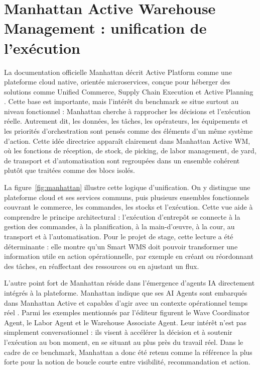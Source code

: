 
\section{Manhattan Active Warehouse Management  :  unification de l’exécution}

\label{sec:2.3}

La documentation officielle Manhattan décrit Active Platform comme une plateforme cloud native, orientée microservices, conçue pour héberger des solutions comme Unified Commerce, Supply Chain Execution et Active Planning \cite{ref4}. Cette base est importante, mais l’intérêt du benchmark se situe surtout au niveau fonctionnel : Manhattan cherche à rapprocher les décisions et l’exécution réelle. Autrement dit, les données, les tâches, les opérateurs, les équipements et les priorités d’orchestration sont pensés comme des éléments d’un même système d’action. Cette idée directrice apparaît clairement dans Manhattan Active WM, où les fonctions de réception, de stock, de picking, de labor management, de yard, de transport et d’automatisation sont regroupées dans un ensemble cohérent plutôt que traitées comme des blocs isolés.




La figure~\ref{fig:manhattan} illustre cette logique d’unification. On y distingue une plateforme cloud et ses services communs, puis plusieurs ensembles fonctionnels couvrant le commerce, les commandes, les stocks et l’exécution. Cette vue aide à comprendre le principe architectural : l’exécution d’entrepôt se connecte à la gestion des commandes, à la planification, à la main-d’œuvre, à la cour, au transport et à l’automatisation. Pour le projet de stage, cette lecture a été déterminante : elle montre qu’un Smart WMS doit pouvoir transformer une information utile en action opérationnelle, par exemple en créant ou réordonnant des tâches, en réaffectant des ressources ou en ajustant un flux.


L’autre point fort de Manhattan réside dans l’émergence d’agents IA directement intégrés à la plateforme. Manhattan indique que ses AI Agents sont embarqués dans Manhattan Active et capables d’agir avec un contexte opérationnel temps réel \cite{ref5}. Parmi les exemples mentionnés par l’éditeur figurent le Wave Coordinator Agent, le Labor Agent et le Warehouse Associate Agent. Leur intérêt n’est pas simplement conversationnel : ils visent à accélérer la décision et à soutenir l’exécution au bon moment, en se situant au plus près du travail réel. Dans le cadre de ce benchmark, Manhattan a donc été retenu comme la référence la plus forte pour la notion de boucle courte entre visibilité, recommandation et action.


